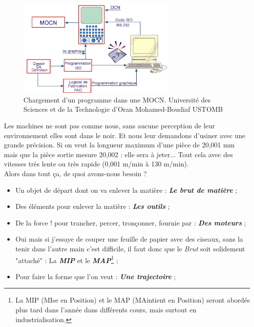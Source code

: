 \documentclass[
	11pt, %
	fleqn, %
	a4paper, %
]{LegrandOrangeBook}
\begin{document}
\begin{figure}[H] %
	\centering %
	\includegraphics[width=0.7\textwidth]{Images/iso.JPG} %
	\caption{Chargement d'un programme dans une MOCN. Université des Sciences et de la Technologie d'Oran Mohamed-Boudiaf USTOMB}
	\label{iso3} %
\end{figure}



Les machines ne sont pas comme nous, sans aucune perception de leur environnement elles sont dans le noir. Et nous leur demandons d'usiner avec une grande précision. Si on veut la longueur maximum d'une pièce de 20,001 mm mais que la pièce sortie mesure 20,002 : elle sera à jeter... Tout cela avec des vitesses très lente ou très rapide (0,001 m/min à 130 m/min). \\



Alors dans tout ça, de quoi avons-nous besoin ? \\

\begin{theorem}
\begin{itemize}
    \item Un objet de départ dont on va enlever la matière : \textit{\textbf{Le brut de matière}} ;
    \item Des éléments pour enlever la matière : \textit{\textbf{Les outils}} ;
    \item De la force ! pour trancher, percer, tronçonner, fournie par : \textit{\textbf{Des moteurs}} ; 
    \item Oui mais si j'essaye de couper une feuille de papier avec des ciseaux, sans la tenir dans l'autre main c'est difficile, il faut donc que le \textit{Brut} soit solidement "attaché" : La \textit{\textbf{MIP}} et le \textit{\textbf{MAP}}\footnote{La MIP (MIse en Position) et le MAP (MAintient en Position) seront abordés plus tard dans l'année dans différents cours, mais surtout en industrialisation.}  ;
    \item  Pour faire la forme que l'on veut : \textit{\textbf{Une trajectoire}} ;
\end{itemize}
\end{theorem}
\end{document}
